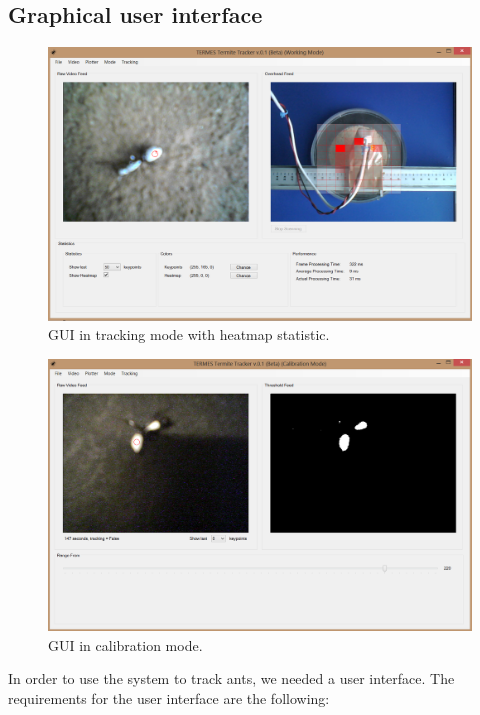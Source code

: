 
\subsection{Graphical user interface}
\begin{figure}[ht!]
  \centering
    \includegraphics[scale=0.35]{img/HeatmapGUI}
  \caption{GUI in tracking mode with heatmap statistic.}
  \label{fig:gui_heat}
\end{figure}

\begin{figure}[ht!]
  \centering
    \includegraphics[scale=0.35]{img/GUI_calib}
  \caption{GUI in calibration mode.}
  \label{fig:gui_thresh}
\end{figure}

In order to use the system to track ants, we needed a user interface. The requirements for the user interface are the following:

